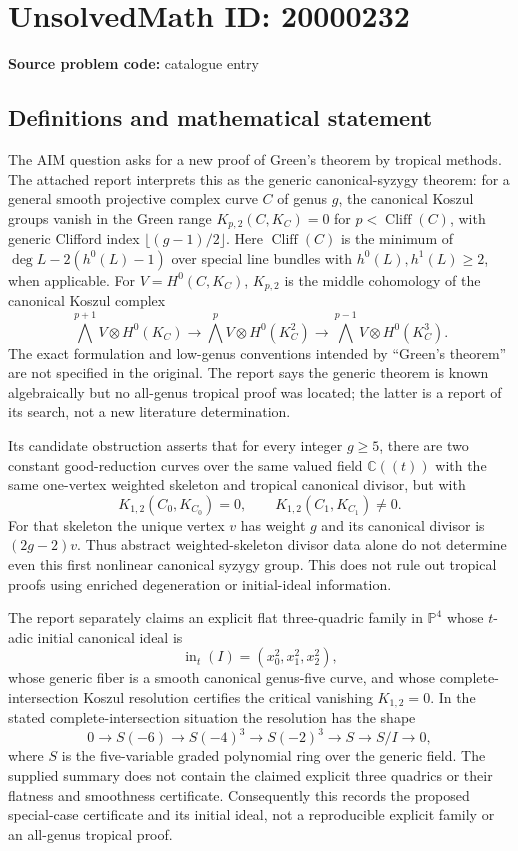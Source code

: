 \documentclass[11pt]{article}
\newcommand{\C}{\mathbb{C}}
\newcommand{\PP}{\mathbb{P}}
\begin{document}
\section*{UnsolvedMath ID: 20000232}
\textbf{Source problem code:} catalogue entry
\subsection{Definitions and mathematical statement}
The AIM question asks for a new proof of Green's theorem by tropical methods. The attached report interprets this as the generic canonical-syzygy theorem: for a general smooth projective complex curve \(C\) of genus \(g\), the canonical Koszul groups vanish in the Green range \(K_{p,2}(C,K_C)=0\) for \(p<\operatorname{Cliff}(C)\), with generic Clifford index \(\lfloor(g-1)/2\rfloor\). Here \(\operatorname{Cliff}(C)\) is the minimum of \(\deg L-2(h^0(L)-1)\) over special line bundles with \(h^0(L),h^1(L)\geq2\), when applicable. For \(V=H^0(C,K_C)\), \(K_{p,2}\) is the middle cohomology of the canonical Koszul complex
\[
\bigwedge^{p+1}V\otimes H^0(K_C)
\longrightarrow\bigwedge^pV\otimes H^0(K_C^2)
\longrightarrow\bigwedge^{p-1}V\otimes H^0(K_C^3).
\]
The exact formulation and low-genus conventions intended by ``Green's theorem'' are not specified in the original. The report says the generic theorem is known algebraically but no all-genus tropical proof was located; the latter is a report of its search, not a new literature determination.

Its candidate obstruction asserts that for every integer \(g\geq5\), there are two constant good-reduction curves over the same valued field \(\C((t))\) with the same one-vertex weighted skeleton and tropical canonical divisor, but with
\[
K_{1,2}(C_0,K_{C_0})=0,\qquad K_{1,2}(C_1,K_{C_1})\ne0.
\]
For that skeleton the unique vertex \(v\) has weight \(g\) and its canonical divisor is \((2g-2)v\). Thus abstract weighted-skeleton divisor data alone do not determine even this first nonlinear canonical syzygy group. This does not rule out tropical proofs using enriched degeneration or initial-ideal information.

The report separately claims an explicit flat three-quadric family in \(\PP^4\) whose \(t\)-adic initial canonical ideal is
\[
\operatorname{in}_t(I)=(x_0^2,x_1^2,x_2^2),
\]
whose generic fiber is a smooth canonical genus-five curve, and whose complete-intersection Koszul resolution certifies the critical vanishing \(K_{1,2}=0\). In the stated complete-intersection situation the resolution has the shape
\[
0\longrightarrow S(-6)\longrightarrow S(-4)^3
\longrightarrow S(-2)^3\longrightarrow S\longrightarrow S/I\longrightarrow0,
\]
where \(S\) is the five-variable graded polynomial ring over the generic field. The supplied summary does not contain the claimed explicit three quadrics or their flatness and smoothness certificate. Consequently this records the proposed special-case certificate and its initial ideal, not a reproducible explicit family or an all-genus tropical proof.
\end{document}
